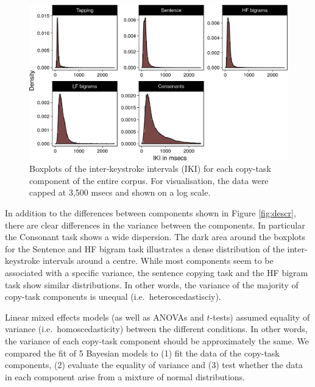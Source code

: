 \documentclass[,man,floatsintext]{apa6}
\begin{document}
\begin{figure}[!h]

{\centering \includegraphics{ct_files/figure-latex/fig2-1} 

}

\caption{\label{fig:descr}Boxplots of the inter-keystroke intervals (IKI) for each copy-task component of the entire corpus. For visualisation, the data were capped at 3,500 msecs and shown on a log scale.}\label{fig:fig2}
\end{figure}

In addition to the differences between components shown in Figure \ref{fig:descr}, there are clear differences in the variance between the components. In particular the Consonant task shows a wide dispersion. The dark area around the boxplots for the Sentence and HF bigram task illustrates a dense distribution of the inter-keystroke intervals around a centre. While most components seem to be associated with a specific variance, the sentence copying task and the HF bigram task show similar distributions. In other words, the variance of the majority of copy-task components is unequal (i.e.~heteroscedastisciy).

Linear mixed effects models (as well as ANOVAs and \(t\)-tests) assumed equality of variance (i.e.~homoscedasticity) between the different conditions. In other words, the variance of each copy-task component should be approximately the same. We compared the fit of 5 Bayesian models to (1) fit the data of the copy-task components, (2) evaluate the equality of variance and (3) test whether the data in each component arise from a mixture of normal distributions.
\end{document}
